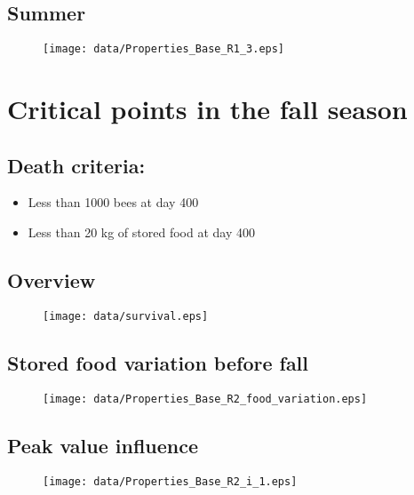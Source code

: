 \documentclass[
paper=128mm:96mm, %
fontsize=11pt, %
pagesize, %
parskip=half-, %
]{scrartcl} %
\theoremstyle{mythmstyle} %
\begin{document}
\subsection{Summer}
\begin{figure}[H]
			\centering
			\texttt{[image: data/Properties\_Base\_R1\_3.eps]}
\end{figure}
\clearpage

\section{Critical points in the fall season}
\subsection{Death criteria:}
\begin{itemize}
\item Less than 1000 bees at day 400
\item Less than 20 kg of stored food at day 400
\end{itemize}
\clearpage
\subsection{Overview}
\begin{figure}[H]
			\centering
			\texttt{[image: data/survival.eps]}
\end{figure}
\clearpage
\subsection{Stored food variation before fall}
\begin{figure}[H]
			\centering
			\texttt{[image: data/Properties\_Base\_R2\_food\_variation.eps]}
\end{figure}
\clearpage
\subsection{Peak value influence}
\begin{figure}[H]
			\centering
			\texttt{[image: data/Properties\_Base\_R2\_i\_1.eps]}
\end{figure}
\clearpage
\end{document}
